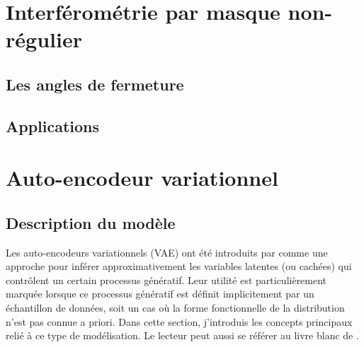 \section{Interférométrie par masque non-régulier}


\subsection{Les angles de fermeture}

\subsection{Applications}


\section{Auto-encodeur variationnel}

\subsection{Description du modèle}

Les auto-encodeurs variationnels (VAE) ont été introduits par \citet{Kingma2013} comme une approche 
pour inférer approximativement les variables latentes (ou cachées) qui contrôlent un certain processus génératif. 
Leur utilité est particulièrement marquée lorsque ce processus génératif est définit implicitement par un échantillon de données, 
soit un cas où la forme fonctionnelle de la distribution n'est pas connue a priori.
Dans cette section, j'introduis 
les concepts principaux relié à ce type de modélisation. 
Le lecteur peut aussi se référer au livre blanc de \citet{Kingma2019}.

